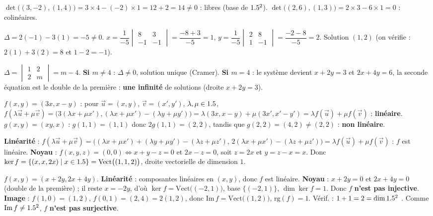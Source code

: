 $\det\big((3,-2),(1,4)\big)=3\times4-(-2)\times1=12+2=14\neq0$ : libres (base de $1.5^2$).\;
$\det\big((2,6),(1,3)\big)=2\times3-6\times1=0$ : colinéaires.

$\Delta=2(-1)-3(1)=-5\neq0$. $x=\dfrac{1}{-5}\begin{vmatrix}8&3\\-1&-1\end{vmatrix}=\dfrac{-8+3}{-5}=1$,\;
$y=\dfrac{1}{-5}\begin{vmatrix}2&8\\1&-1\end{vmatrix}=\dfrac{-2-8}{-5}=2$. Solution $(1,2)$
(on vérifie : $2(1)+3(2)=8$ et $1-2=-1$). \checkmark

$\Delta=\begin{vmatrix}1&2\\2&m\end{vmatrix}=m-4$.\;
\textbf{Si $m\neq4$} : $\Delta\neq0$, solution unique (Cramer).\;
\textbf{Si $m=4$} : le système devient $x+2y=3$ et $2x+4y=6$, la seconde équation est le double
de la première : \textbf{une infinité} de solutions (droite $x+2y=3$).

$f(x,y)=(3x,x-y)$ : pour $\vec u=(x,y)$, $\vec v=(x',y')$, $\lambda,\mu\in1.5$,
$f(\lambda\vec u+\mu\vec v)=\big(3(\lambda x+\mu x'),(\lambda x+\mu x')-(\lambda y+\mu y')\big)
=\lambda(3x,x-y)+\mu(3x',x'-y')=\lambda f(\vec u)+\mu f(\vec v)$ : \textbf{linéaire}.\;
$g(x,y)=(xy,x)$ : $g(1,1)=(1,1)$ donc $2g(1,1)=(2,2)$, tandis que $g(2,2)=(4,2)\neq(2,2)$ :
\textbf{non linéaire}.

\textbf{Linéarité} : $f(\lambda\vec u+\mu\vec v)=\big((\lambda x+\mu x')+(\lambda y+\mu y')-(\lambda z+\mu z'),\,2(\lambda x+\mu x')-(\lambda z+\mu z')\big)
=\lambda f(\vec u)+\mu f(\vec v)$ : $f$ est linéaire.\;
\textbf{Noyau} : $f(x,y,z)=(0,0)\Leftrightarrow x+y-z=0$ et $2x-z=0$, soit $z=2x$ et $y=z-x=x$.
Donc $\ker f=\{(x,x,2x)\mid x\in1.5\}=\mathrm{Vect}\big((1,1,2)\big)$, droite vectorielle de
dimension $1$.

$f(x,y)=(x+2y,2x+4y)$.\;
\textbf{Linéarité} : composantes linéaires en $(x,y)$, donc $f$ est linéaire.\;
\textbf{Noyau} : $x+2y=0$ et $2x+4y=0$ (double de la première) ; il reste $x=-2y$, d'où
$\ker f=\mathrm{Vect}\big((-2,1)\big)$, base $\{(-2,1)\}$, $\dim\ker f=1$. Donc $f$ \textbf{n'est pas
injective}.\;
\textbf{Image} : $f(1,0)=(1,2)$, $f(0,1)=(2,4)=2(1,2)$, donc
$\mathrm{Im}\,f=\mathrm{Vect}\big((1,2)\big)$, $\mathrm{rg}(f)=1$. Vérif. : $1+1=2=\dim1.5^2$ \checkmark.
Comme $\mathrm{Im}\,f\neq1.5^2$, $f$ \textbf{n'est pas surjective}.

